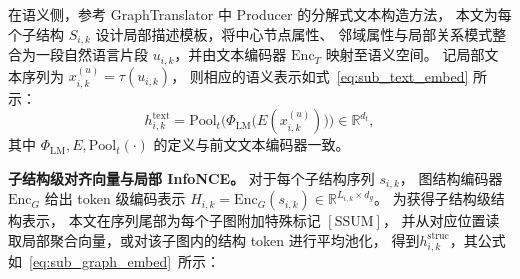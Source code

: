 在语义侧，参考 GraphTranslator \cite{Zhang2024GraphTranslatorAG}中 Producer 的分解式文本构造方法，
本文为每个子结构 \(S_{i,k}\) 设计局部描述模板，将中心节点属性、
邻域属性与局部关系模式整合为一段自然语言片段
\(
u_{i,k}
\)，并由文本编码器 \(\mathrm{Enc}_T\) 映射至语义空间。
记局部文本序列为
\(
x^{(u)}_{i,k} = \tau(u_{i,k})
\)，
则相应的语义表示如式~\ref{eq:sub_text_embed} 所示：
\begin{equation}
  h^{\mathrm{text}}_{i,k}
  = \mathrm{Pool}_t\!\bigl(\Phi_{\mathrm{LM}}\bigl(E(x^{(u)}_{i,k})\bigr)\bigr)
  \in \mathbb{R}^{d_t},
  \label{eq:sub_text_embed}
\end{equation}
其中 \(\Phi_{\mathrm{LM}}, E, \mathrm{Pool}_t(\cdot)\) 的定义与前文文本编码器一致。

\textbf{子结构级对齐向量与局部 InfoNCE。}
对于每个子结构序列 \(s_{i,k}\)，
图结构编码器 \(\mathrm{Enc}_G\) 给出 token 级编码表示
\(
H_{i,k} = \mathrm{Enc}_G(s_{i,k}) \in \mathbb{R}^{L_{i,k}\times d_g}
\)。
为获得子结构级结构表示，
本文在序列尾部为每个子图附加特殊标记 \([\mathrm{SSUM}]\)，
并从对应位置读取局部聚合向量，或对该子图内的结构 token 进行平均池化，
得到\( h^{\mathrm{struc}}_{i,k}\)，其公式如~\ref{eq:sub_graph_embed}\ 所示：

